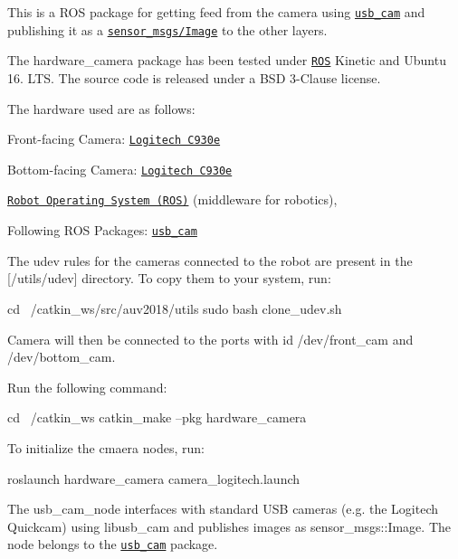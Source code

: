 This is a R\+OS package for getting feed from the camera using \href{http://wiki.ros.org/usb_cam}{\tt usb\+\_\+cam} and publishing it as a \href{http://docs.ros.org/api/sensor_msgs/html/msg/Image.html}{\tt sensor\+\_\+msgs/\+Image} to the other layers.

The {\ttfamily hardware\+\_\+camera} package has been tested under \href{http://www.ros.org}{\tt R\+OS} Kinetic and Ubuntu 16. L\+TS. The source code is released under a B\+SD 3-\/\+Clause license.

The hardware used are as follows\+:
\begin{DoxyItemize}
\item Front-\/facing Camera\+: \href{https://www.logitech.com/en-in/product/c930e-webcam}{\tt Logitech C930e}
\item Bottom-\/facing Camera\+: \href{https://www.logitech.com/en-in/product/c930e-webcam}{\tt Logitech C930e}
\end{DoxyItemize}


\begin{DoxyItemize}
\item \href{http://wiki.ros.org}{\tt Robot Operating System (R\+OS)} (middleware for robotics),
\item Following R\+OS Packages\+: \href{http://wiki.ros.org/usb_cam}{\tt usb\+\_\+cam}
\end{DoxyItemize}

The udev rules for the cameras connected to the robot are present in the \mbox{[}/utils/udev\mbox{]} directory. To copy them to your system, run\+: 
\begin{DoxyCode}
cd ~/catkin\_ws/src/auv2018/utils
sudo bash clone\_udev.sh
\end{DoxyCode}


Camera will then be connected to the ports with id {\ttfamily /dev/front\+\_\+cam} and {\ttfamily /dev/bottom\+\_\+cam}.

Run the following command\+: 
\begin{DoxyCode}
cd ~/catkin\_ws
catkin\_make --pkg hardware\_camera
\end{DoxyCode}


To initialize the cmaera nodes, run\+: 
\begin{DoxyCode}
roslaunch hardware\_camera camera\_logitech.launch
\end{DoxyCode}


The {\ttfamily usb\+\_\+cam\+\_\+node} interfaces with standard U\+SB cameras (e.\+g. the Logitech Quickcam) using libusb\+\_\+cam and publishes images as {\ttfamily sensor\+\_\+msgs\+::\+Image}. The node belongs to the \href{http://wiki.ros.org/usb_cam}{\tt usb\+\_\+cam} package.


